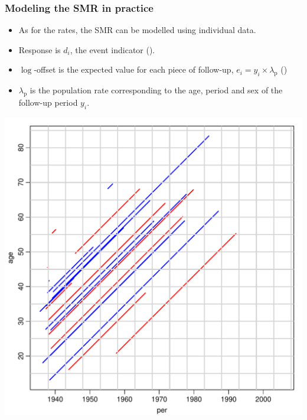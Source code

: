 \begin{frame}
  \frametitle{Modeling the SMR in practice}
  \begin{itemize}[<+->]
  \item As for the rates, the SMR can be modelled using individual
    data.
  \item Response is $d_i$, the event indicator ().
  \item $\log$-offset is the expected value for each piece of
    follow-up, $e_i=y_i \times \lambda_\text{p}$ ()
  \item $\lambda_\text{p}$ is the population rate corresponding to the age,
    period and sex of the follow-up period $y_i$.
  \end{itemize}
\end{frame}

\begin{frame}[fragile]
\includegraphics[height=0.99\textheight,keepaspectratio]{thL-lexis3}
\end{frame}

